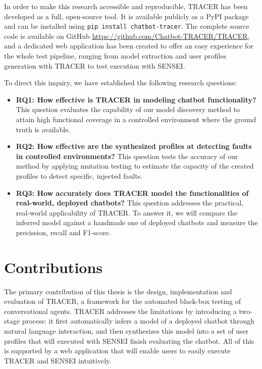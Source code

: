 In order to make this research accessible and reproducible, \ac{TRACER} has been developed as a full, open-source tool.
It is available publicly as a \ac{PyPI} package \autocite{sotillodelhornoChatbottracerToolModel} and can be installed using \texttt{pip install chatbot-tracer}.
The complete source code is available on GitHub \url{https://github.com/Chatbot-TRACER/TRACER}, and a dedicated web application has been created to offer an easy experience for the whole test pipeline, ranging from model extraction and user profiles generation with \ac{TRACER} to test execution with SENSEI.


To direct this inquiry, we have established the following research questions:
\begin{itemize}
\item \textbf{RQ1: How effective is TRACER in modeling chatbot functionality?}
  This question evaluates the capability of our model discovery method to attain high functional coverage in a controlled environment where the ground truth is available.
\item \textbf{RQ2: How effective are the synthesized profiles at detecting faults in controlled environments?}
  This question tests the accuracy of our method by applying mutation testing \autocite{gomez-abajoMutationTestingTaskOriented2024} to estimate the capacity of the created profiles to detect specific, injected faults.
\item \textbf{RQ3: How accurately does TRACER model the functionalities of real-world, deployed chatbots?}
  This question addresses the practical, real-world applicability of \ac{TRACER}.
  To answer it, we will compare the inferred model against a handmade one
  of deployed chatbots
  and measure the precission, recall and F1-score.
\end{itemize}

\section{Contributions}

The primary contribution of this thesis is the design, implementation and evaluation of \acf{TRACER},
a framework for the automated black-box testing of conversational agents.
\ac{TRACER} addresses the limitations by introducing a two-stage process:
it first automatically infers a model of a deployed chatbot through natural language interaction,
and then synthesizes this model into a set of user profiles
that will executed with SENSEI \autocite{delaraSensei} finish evaluating the chatbot.
All of this is supported by a web application that will enable users to easily execute TRACER and SENSEI intuitively.

